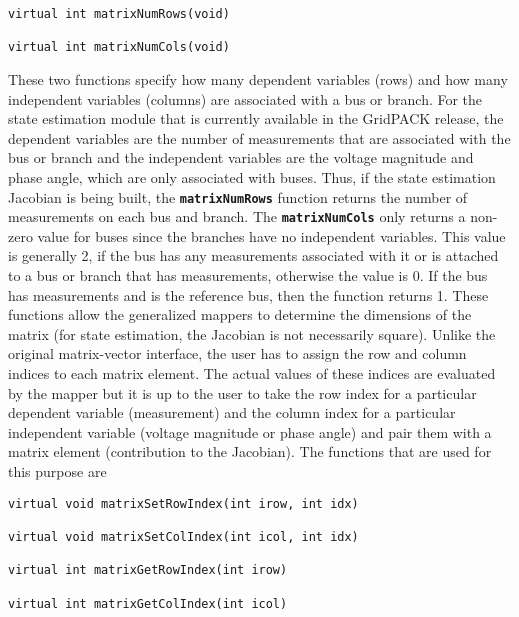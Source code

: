 {
\color{red}
\begin{Verbatim}[fontseries=b]
virtual int matrixNumRows(void)

virtual int matrixNumCols(void)
\end{Verbatim}
}

These two functions specify how many dependent variables (rows) and how many independent variables (columns) are associated with a bus or branch. For the state estimation module that is currently available in the GridPACK release, the dependent variables are the  number of measurements that are associated with the bus or branch and the independent variables are the voltage magnitude and phase angle, which are only associated with buses. Thus, if the state estimation Jacobian is being built, the \texttt{\textbf{matrixNumRows}} function returns the number of measurements on each bus and branch. The \texttt{\textbf{matrixNumCols}} only returns a non-zero value for buses since the branches have no independent variables. This value is generally 2, if the bus has any measurements associated with it or is attached to a bus or branch that has measurements, otherwise the value is 0. If the bus has measurements and is the reference bus, then the function returns 1. These functions allow the generalized mappers to determine the dimensions of the matrix (for state estimation, the Jacobian is not necessarily square).
Unlike the original matrix-vector interface, the user has to assign the row and column indices to each matrix element. The actual values of these indices are evaluated by the mapper but it is up to the user to take the row index for a particular dependent variable (measurement) and the column index for a particular independent variable (voltage magnitude or phase angle) and pair them with a matrix element (contribution to the Jacobian). The functions that are used for this purpose are

{
\color{red}
\begin{Verbatim}[fontseries=b]
virtual void matrixSetRowIndex(int irow, int idx)

virtual void matrixSetColIndex(int icol, int idx)

virtual int matrixGetRowIndex(int irow)

virtual int matrixGetColIndex(int icol)
\end{Verbatim}
}


